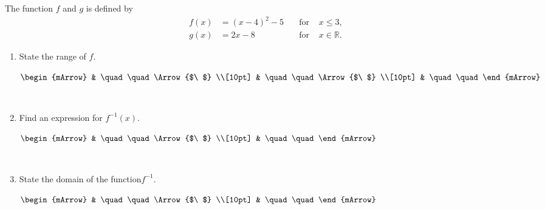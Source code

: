 \clearpage\noindent%
\begin{mtask}[resume]
    \task The function $f$ and $g$ is defined by 
           \begin{align*}
               f(x) &= (x-4)^2 - 5 &  \quad \text{for } & x \leqslant 3, \\
               g(x) &= 2x - 8       &  \quad \text{for } & x \in \mathbb{R}.
            \end{align*}

		  \begin{enumerate}[label=(\alph*)]
		   \item  State the range of $f$.
		        \begin{envSolution}[height=3cm]
			       $\begin{mArrow}
			             &  \quad\quad      \Arrow{$\ $} \\[10pt]
			             &  \quad\quad      \Arrow{$\ $} \\[10pt]
                        &  \quad\quad	   
	                \end{mArrow}$
                \end{envSolution} 					
		  	    \begin{exercise}\begin{shortsolution}  
				       $ \quad\quad  $
			    \end{shortsolution}\end{exercise}

            \item Find an expression for $f^{-1}(x)$.
		        \begin{envSolution}[height=3cm]
			       $\begin{mArrow}
			             &  \quad\quad      \Arrow{$\ $} \\[10pt]
                         &  \quad\quad	   
	                \end{mArrow}$
                \end{envSolution} 			  
		  	    \begin{exercise}\begin{shortsolution}  
				       $ \quad\quad  $
			    \end{shortsolution}\end{exercise}
				
			\item State the domain of the function$f^{-1}$.
		        \begin{envSolution}[height=3cm]
			       $\begin{mArrow}
			             &  \quad\quad      \Arrow{$\ $} \\[10pt]
                         &  \quad\quad	   
	                \end{mArrow}$
                \end{envSolution} 			  
		  	    \begin{exercise}\begin{shortsolution}  
				       $ \quad\quad  $
			    \end{shortsolution}\end{exercise}
			

\end{enumerate}
\end{mtask}
